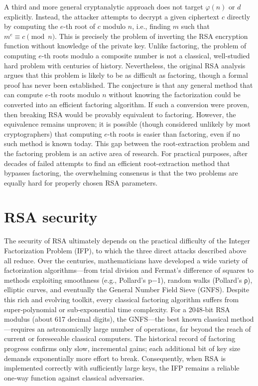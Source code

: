 A third and more general cryptanalytic approach does not target \(\varphi(n)\) or \(d\) explicitly. Instead, the attacker attempts to decrypt a given ciphertext \(c\) directly by computing the \(e\)-th root of \(c\) modulo \(n\), i.e., finding \(m\) such that \(m^e \equiv c \pmod{n}\). This is precisely the problem of inverting the RSA encryption function without knowledge of the private key. Unlike factoring, the problem of computing \(e\)-th roots modulo a composite number is not a classical, well-studied hard problem with centuries of history. Nevertheless, the original RSA analysis argues that this problem is likely to be as difficult as factoring, though a formal proof has never been established. The conjecture is that any general method that can compute \(e\)-th roots modulo \(n\) without knowing the factorization could be converted into an efficient factoring algorithm. If such a conversion were proven, then breaking RSA would be provably equivalent to factoring. However, the equivalence remains unproven; it is possible (though considered unlikely by most cryptographers) that computing \(e\)-th roots is easier than factoring, even if no such method is known today. This gap between the root-extraction problem and the factoring problem is an active area of research. For practical purposes, after decades of failed attempts to find an efficient root-extraction method that bypasses factoring, the overwhelming consensus is that the two problems are equally hard for properly chosen RSA parameters.

\section{RSA security }
The security of RSA ultimately depends on the practical difficulty of the Integer Factorization Problem (IFP), to which the three direct attacks described above all reduce. Over the centuries, mathematicians have developed a wide variety of factorization algorithms—from trial division and Fermat’s difference of squares to methods exploiting smoothness (e.g., Pollard’s p−1), random walks (Pollard’s ρ), elliptic curves, and eventually the General Number Field Sieve (GNFS). Despite this rich and evolving toolkit, every classical factoring algorithm suffers from super‑polynomial or sub‑exponential time complexity. For a 2048‑bit RSA modulus (about 617 decimal digits), the GNFS—the best known classical method—requires an astronomically large number of operations, far beyond the reach of current or foreseeable classical computers. The historical record of factoring progress confirms only slow, incremental gains; each additional bit of key size demands exponentially more effort to break. Consequently, when RSA is implemented correctly with sufficiently large keys, the IFP remains a reliable one‑way function against classical adversaries.


